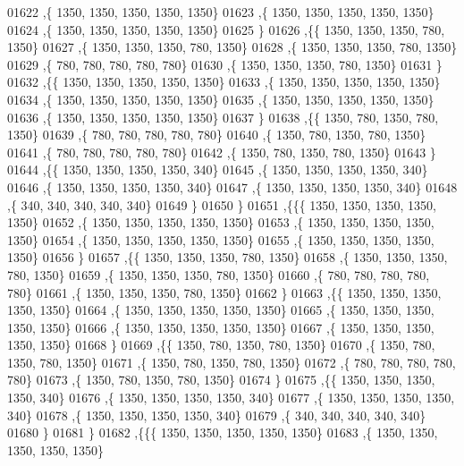 \begin{DoxyCode}
01622    ,\{  1350,  1350,  1350,  1350,  1350\}
01623    ,\{  1350,  1350,  1350,  1350,  1350\}
01624    ,\{  1350,  1350,  1350,  1350,  1350\}
01625    \}
01626   ,\{\{  1350,  1350,  1350,   780,  1350\}
01627    ,\{  1350,  1350,  1350,   780,  1350\}
01628    ,\{  1350,  1350,  1350,   780,  1350\}
01629    ,\{   780,   780,   780,   780,   780\}
01630    ,\{  1350,  1350,  1350,   780,  1350\}
01631    \}
01632   ,\{\{  1350,  1350,  1350,  1350,  1350\}
01633    ,\{  1350,  1350,  1350,  1350,  1350\}
01634    ,\{  1350,  1350,  1350,  1350,  1350\}
01635    ,\{  1350,  1350,  1350,  1350,  1350\}
01636    ,\{  1350,  1350,  1350,  1350,  1350\}
01637    \}
01638   ,\{\{  1350,   780,  1350,   780,  1350\}
01639    ,\{   780,   780,   780,   780,   780\}
01640    ,\{  1350,   780,  1350,   780,  1350\}
01641    ,\{   780,   780,   780,   780,   780\}
01642    ,\{  1350,   780,  1350,   780,  1350\}
01643    \}
01644   ,\{\{  1350,  1350,  1350,  1350,   340\}
01645    ,\{  1350,  1350,  1350,  1350,   340\}
01646    ,\{  1350,  1350,  1350,  1350,   340\}
01647    ,\{  1350,  1350,  1350,  1350,   340\}
01648    ,\{   340,   340,   340,   340,   340\}
01649    \}
01650   \}
01651  ,\{\{\{  1350,  1350,  1350,  1350,  1350\}
01652    ,\{  1350,  1350,  1350,  1350,  1350\}
01653    ,\{  1350,  1350,  1350,  1350,  1350\}
01654    ,\{  1350,  1350,  1350,  1350,  1350\}
01655    ,\{  1350,  1350,  1350,  1350,  1350\}
01656    \}
01657   ,\{\{  1350,  1350,  1350,   780,  1350\}
01658    ,\{  1350,  1350,  1350,   780,  1350\}
01659    ,\{  1350,  1350,  1350,   780,  1350\}
01660    ,\{   780,   780,   780,   780,   780\}
01661    ,\{  1350,  1350,  1350,   780,  1350\}
01662    \}
01663   ,\{\{  1350,  1350,  1350,  1350,  1350\}
01664    ,\{  1350,  1350,  1350,  1350,  1350\}
01665    ,\{  1350,  1350,  1350,  1350,  1350\}
01666    ,\{  1350,  1350,  1350,  1350,  1350\}
01667    ,\{  1350,  1350,  1350,  1350,  1350\}
01668    \}
01669   ,\{\{  1350,   780,  1350,   780,  1350\}
01670    ,\{  1350,   780,  1350,   780,  1350\}
01671    ,\{  1350,   780,  1350,   780,  1350\}
01672    ,\{   780,   780,   780,   780,   780\}
01673    ,\{  1350,   780,  1350,   780,  1350\}
01674    \}
01675   ,\{\{  1350,  1350,  1350,  1350,   340\}
01676    ,\{  1350,  1350,  1350,  1350,   340\}
01677    ,\{  1350,  1350,  1350,  1350,   340\}
01678    ,\{  1350,  1350,  1350,  1350,   340\}
01679    ,\{   340,   340,   340,   340,   340\}
01680    \}
01681   \}
01682  ,\{\{\{  1350,  1350,  1350,  1350,  1350\}
01683    ,\{  1350,  1350,  1350,  1350,  1350\}

\end{DoxyCode}
